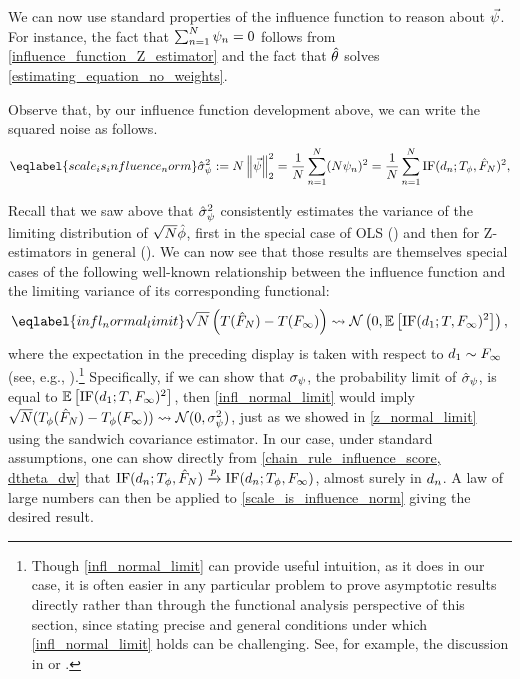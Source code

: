 %
We can now use standard properties of the influence function to reason about
$\vec{\psi}$. For instance, the fact that $\sum_{n=1}^N \psi_n = 0$ follows from
\eqref{influence_function_Z_estimator} and the fact that $\hat{\theta}$ solves
\eqref{estimating_equation_no_weights}.


%
Observe that, by our influence function development above, we can write
the squared noise as follows.
%
\begin{align} \eqlabel{scale_is_influence_norm}
%
\inflscale^2 := N \vnorm{\inflvec}_2^2 =
\meann (N \infl_n)^2 = \meann \ic(\d_n; T_\thetafun, \fhat)^2,
%
\end{align}

Recall that we saw above that $\hat{\sigma}_{\psi}^2$ consistently estimates the variance
of the limiting distribution of $\sqrt{N}\hat{\phi}$, first in the special
case of OLS () and then for
Z-estimators in general ().  We can now
see that those results are themselves special cases of the following well-known
relationship between the influence function and the limiting variance of its
corresponding functional:
%
\begin{align}\eqlabel{infl_normal_limit}
%
\sqrt{N}\left(T(\fhat) - T(\flim) \right) \dlim
\mathcal{N}\left(0, \expect{\ic(\d_1; T, \flim)^2}\right),
%
\end{align}
%
where the expectation in the preceding display is taken with respect to $d_1
\sim F_{\infty}$ (see, e.g., \citet[Eq.
2.1.8]{hampel1986robustbook}).\footnote{Though \eqref{infl_normal_limit} can
provide useful intuition, as it does in our case, it is often easier in any
particular problem to prove asymptotic results directly rather than through the
functional analysis perspective of this section, since stating precise and
general conditions under which \eqref{infl_normal_limit} holds can be
challenging. See, for example, the discussion in \citet[Chapter
6]{serfling2009approximation} or \citet[Chapter 20]{vaart2000asymptotic}.}
%
Specifically, if we can show that $\sigma_{\psi}$, the probability limit of
$\hat{\sigma}_{\psi}$, is equal to $\mathbb{E}\left[\mathrm{IF}(d_1; T, F_{\infty})^2\right]$, then
\eqref{infl_normal_limit} would imply $\sqrt{N}(T_\phi(\hat{F}_N) - T_\phi(F_{\infty}))
\rightsquigarrow \mathcal{N}(0, \sigma_{\psi}^2)$, just as we showed in
\eqref{z_normal_limit} using the sandwich covariance estimator. In our case,
under standard assumptions, one can show directly from
\eqref{chain_rule_influence_score, dtheta_dw} that $\mathrm{IF}(d_n; T_\phi,
\hat{F}_N) \xrightarrow{p} \mathrm{IF}(d_n; T_\phi, F_{\infty})$, almost surely in $d_n$.  A law of
large numbers can then be applied to \eqref{scale_is_influence_norm} giving the
desired result.


